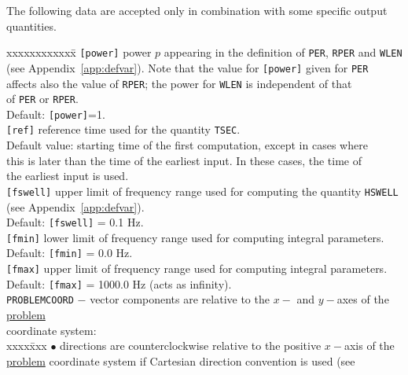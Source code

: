 \documentclass[12pt]{book}
\begin{document}
The following data are accepted only in combination with some specific output quantities.
\begin{tabbing}
 xxxxxxxxxxxx\= \kill
{\tt [power]}      \> power $p$ appearing in the definition of {\tt PER}, {\tt RPER} and {\tt WLEN}\+\\
                     (see Appendix~\ref{app:defvar}). Note that the value for {\tt [power]} given for {\tt PER}\\
                      affects also the value of {\tt RPER}; the power for {\tt WLEN} is independent of that\\
                      of {\tt PER} or {\tt RPER}.\\
                      Default: {\tt [power]}=1.\-\\
{\tt [ref]}        \> reference time used for the quantity {\tt TSEC}.\+\\
                      Default value: starting time of the first computation, except in cases where\\
                      this is later than the time of the earliest input. In these cases, the time of\\
                      the earliest input is used.\-\\
{\tt [fswell]}     \> upper limit of frequency range used for computing the quantity {\tt HSWELL}\+\\
                      (see Appendix~\ref{app:defvar}).\\
                      Default: {\tt [fswell]} = 0.1 Hz.\-\\
{\tt [fmin]}       \> lower limit of frequency range used for computing integral parameters.\+\\
                      Default: {\tt [fmin]} = 0.0 Hz.\-\\
{\tt [fmax]}       \> upper limit of frequency range used for computing integral parameters.\+\\
                      Default: {\tt [fmax]} = 1000.0 Hz (acts as infinity).\-\\
{\tt PROBLEMCOORD} \> $-$ vector components are relative to the $x-$ and $y-$axes of the \underline{problem}\+\\
                      coordinate system:\\
                      \pushtabs
                      xxxx\=xxx \kill
                      {$\bullet$} \> directions are counterclockwise relative to the positive $x-$axis of the\+\\
                                     \underline{problem} coordinate system if Cartesian direction convention is used (see\\

\end{tabbing}
\end{document}
